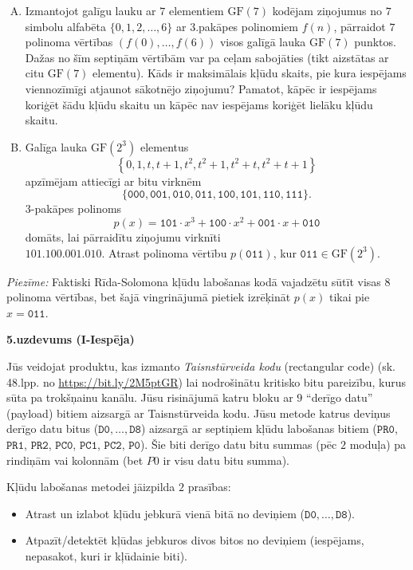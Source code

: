\documentclass[a4paper]{article}
\begin{document}
\begin{enumerate}[(A)]
\item Izmantojot galīgu lauku ar $7$ elementiem 
$\text{GF}(7)$ kodējam ziņojumus no
$7$ simbolu alfabēta $\{ 0,1,2,\ldots,6 \}$ ar 3.pakāpes polinomiem $f(n)$,
pārraidot $7$ polinoma vērtības $(f(0),\ldots,f(6))$ visos
galīgā lauka $\text{GF}(7)$ punktos.
Dažas no šīm septiņām vērtībām var pa ceļam sabojāties 
(tikt aizstātas ar citu $\text{GF}(7)$ elementu).
Kāds ir maksimālais kļūdu skaits, pie kura iespējams
viennozīmīgi atjaunot sākotnējo ziņojumu?
Pamatot, kā\-pēc ir iespējams koriģēt šādu kļūdu skaitu un kāpēc nav
iespējams koriģēt lielāku kļūdu skaitu.
\item Galīga lauka $\text{GF}(2^3)$ elementus
$$\left\{ 0,1,t,t+1,t^2,t^2+1,t^2+t,t^2+t+1 \right\}$$
apzīmējam attiecīgi ar bitu virknēm 
$$\{\mathtt{000},\mathtt{001},\mathtt{010},\mathtt{011},
\mathtt{100},\mathtt{101},\mathtt{110},\mathtt{111}\}.$$
$3$-pakāpes polinoms 
$$p(x) = \mathtt{101}\cdot{}x^3 + \mathtt{100}\cdot{}x^2 + \mathtt{001}\cdot{}x + \mathtt{010}$$
domāts, lai pārraidītu ziņojumu virknīti\\ $\mathtt{101.100.001.010}$.
Atrast polinoma vērtību $p(\mathtt{011})$, kur $\mathtt{011}\in\text{GF}(2^3)$.\\
\end{enumerate}

{\em Piezīme:} Faktiski Rīda-Solomona kļūdu la\-bo\-ša\-nas kodā vajadzētu sūtīt
visas $8$ polinoma vērtības, bet šajā vingrinājumā pietiek izrēķināt $p(x)$ tikai pie $x=\mathtt{011}$.



\vspace{20pt}
{\bf 5.uzdevums (I-Iespēja)}

Jūs veidojat produktu, kas izmanto {\em Taisnstūrveida kodu} 
(rectangular code) (sk. 48.lpp. no \url{https://bit.ly/2M5ptGR})
lai nodrošinātu kritisko bitu pareizību, kurus sūta pa trokšņainu kanālu.
Jūsu risinājumā katru bloku ar $9$ ``derīgo datu'' (payload) bitiem
aizsargā ar Taisnstūrveida kodu.
Jūsu metode katrus
deviņus derīgo datu bitus ($\mathtt{D0},\ldots,\mathtt{D8}$)
aizsargā ar septiņiem kļūdu labošanas bitiem 
($\mathtt{PR0}$, $\mathtt{PR1}$, $\mathtt{PR2}$, $\mathtt{PC0}$, 
$\mathtt{PC1}$, $\mathtt{PC2}$, $\mathtt{P0}$).
Šie biti derīgo datu bitu summas (pēc $2$ moduļa) 
pa rindiņām vai kolonnām (bet $P0$ ir visu 
datu bitu summa). 

Kļūdu labošanas metodei jāizpilda $2$ prasības:
\begin{itemize}
\item Atrast un izlabot kļūdu jebkurā vienā bitā no deviņiem 
($\mathtt{D0},\ldots,\mathtt{D8}$).
\item Atpazīt/detektēt kļūdas jebkuros divos bitos no deviņiem 
(iespējams, nepasakot, kuri ir kļūdainie biti).
\end{itemize}
\end{document}
